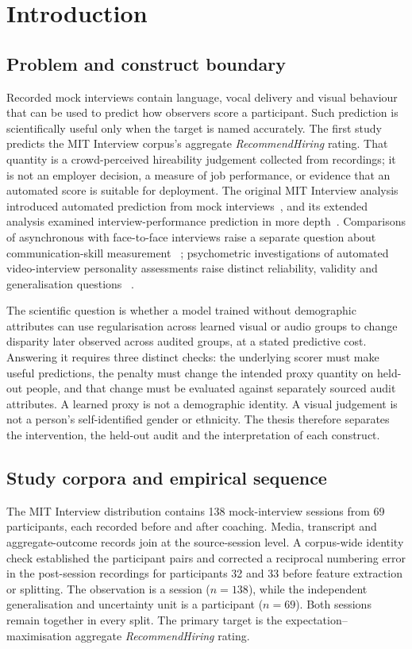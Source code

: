 \chapter{Introduction}
\label{ch:introduction}

\section{Problem and construct boundary}

Recorded mock interviews contain language, vocal delivery and visual behaviour that can be used
to predict how observers score a participant. Such prediction is scientifically useful only when
the target is named accurately. The first study predicts the MIT Interview corpus's aggregate
\emph{RecommendHiring} rating. That quantity is a crowd-perceived hireability judgement collected
from recordings; it is not an employer decision, a measure of job performance, or evidence that an
automated score is suitable for deployment. The original MIT Interview analysis introduced
automated prediction from mock interviews~\cite{Naim2015}, and its extended analysis examined
interview-performance prediction in more depth~\cite{Naim2018}. Comparisons of asynchronous with
face-to-face interviews raise a separate question about communication-skill measurement
~\cite{Rasipuram2016}; psychometric investigations of automated video-interview personality
assessments raise distinct reliability, validity and generalisation questions
~\cite{Hickman2022}.

The scientific question is whether a model trained without demographic attributes can use
regularisation across learned visual or audio groups to change disparity later observed across
audited groups, at a stated predictive cost. Answering it requires three distinct checks:
the underlying scorer must make useful predictions, the penalty must change the intended proxy
quantity on held-out people, and that change must be evaluated against separately sourced audit
attributes. A learned proxy is not a demographic identity. A visual judgement is not a person's
self-identified gender or ethnicity. The thesis therefore separates the intervention, the
held-out audit and the interpretation of each construct.

\section{Study corpora and empirical sequence}

The MIT Interview distribution contains 138 mock-interview sessions from 69 participants, each
recorded before and after coaching. Media, transcript and aggregate-outcome records join at the
source-session level. A corpus-wide identity check established the participant pairs and corrected
a reciprocal numbering error in the post-session recordings for participants 32 and 33 before
feature extraction or splitting. The observation is a session ($n=138$), while the independent
generalisation and uncertainty unit is a participant ($n=69$). Both sessions remain together in
every split. The primary target is the expectation--maximisation aggregate
\emph{RecommendHiring} rating.

